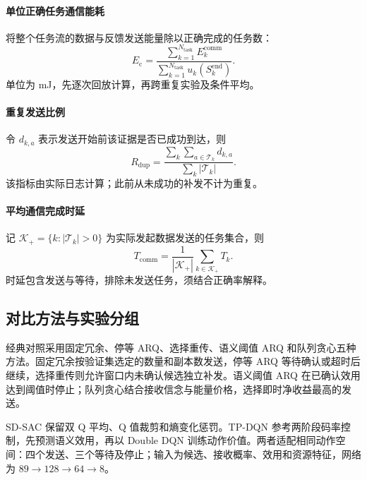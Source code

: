 \paragraph{单位正确任务通信能耗}
将整个任务流的数据与反馈发送能量除以正确完成的任务数：
\begin{equation}
  E_{\mathrm c}=\frac{\sum_{k=1}^{N_{\mathrm{task}}} E_k^{\mathrm{comm}}}
                         {\sum_{k=1}^{N_{\mathrm{task}}} u_k(S_k^{\mathrm{end}})}.
  \label{rq3:eq:metric-energy}
\end{equation}
单位为 mJ，先逐次回放计算，再跨重复实验及条件平均。

\paragraph{重复发送比例}
令 $d_{k,a}$ 表示发送开始前该证据是否已成功到达，则
\begin{equation}
  R_{\mathrm{dup}}=\frac{\sum_k\sum_{a\in\mathcal T_k}d_{k,a}}
                         {\sum_k|\mathcal T_k|}.
  \label{rq3:eq:metric-duplicate}
\end{equation}
该指标由实际日志计算；此前从未成功的补发不计为重复。

\paragraph{平均通信完成时延}
记 $\mathcal K_+=\{k:|\mathcal T_k|>0\}$ 为实际发起数据发送的任务集合，则
\begin{equation}
  T_{\mathrm{comm}}=\frac{1}{|\mathcal K_+|}\sum_{k\in\mathcal K_+}T_k.
  \label{rq3:eq:metric-latency}
\end{equation}
时延包含发送与等待，排除未发送任务，须结合正确率解释。

\subsection{对比方法与实验分组}
\label{rq3:subsec:baselines}

经典对照采用固定冗余、停等 ARQ、选择重传、语义阈值 ARQ 和队列贪心五种方法。固定冗余按验证集选定的数量和副本数发送，停等 ARQ 等待确认或超时后继续，选择重传则允许窗口内未确认候选独立补发。语义阈值 ARQ 在已确认效用达到阈值时停止；队列贪心结合接收信念与能量价格，选择即时净收益最高的发送。

SD-SAC 保留双 Q 平均、Q 值裁剪和熵变化惩罚\citep{zhou2024sdsac}。TP-DQN 参考两阶段码率控制，先预测语义效用，再以 Double DQN 训练动作价值\citep{wu2026twophase}。两者适配相同动作空间：四个发送、三个等待及停止；输入为候选、接收概率、效用和资源特征，网络为 $89\rightarrow128\rightarrow64\rightarrow8$。

